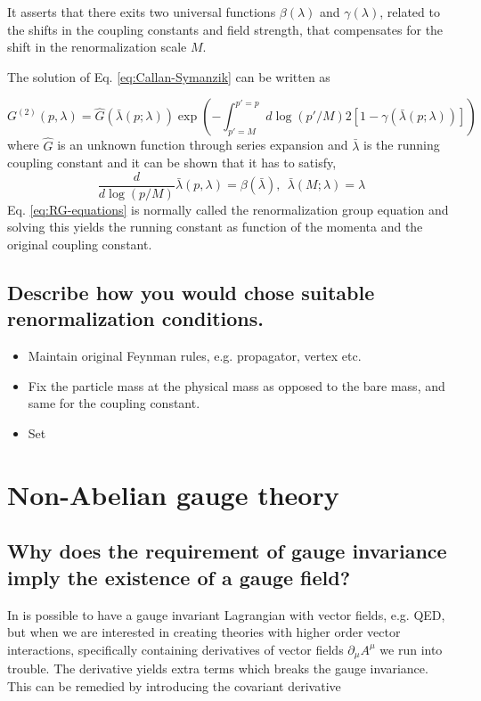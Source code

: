 \documentclass[paper=a4, fontsize=11pt]{scrartcl} %
\numberwithin{equation}{section} %
\numberwithin{figure}{section} %
\numberwithin{table}{section} %
\newcommand{\parentheses}[1]{\ensuremath{\left( #1 \right)}}
\newcommand{\commutator}[1]{\ensuremath{\left[ #1 \right]}}
\begin{document}
It asserts that there exits two universal functions $\beta(\lambda)$ and $\gamma(\lambda)$, related to the shifts in the coupling constants and field strength, that compensates for the shift in the renormalization scale $M$.

The solution of Eq. \eqref{eq:Callan-Symanzik} can be written as

\begin{equation}
G^{(2)}(p,\lambda)= \hat{G}\parentheses{\bar{\lambda}(p;\lambda)} \exp \parentheses{- \int _{p'=M}^{p'=p} d \log (p'/M) 2\commutator{1-\gamma \parentheses{\bar{\lambda}(p;\lambda)}}}
\end{equation}
where $\hat{G}$ is an unknown function through series expansion and $\bar{\lambda}$ is the running coupling constant and it can be shown that it has to satisfy,
\begin{equation}
\frac{d}{d\log(p/M)}\bar{\lambda} (p, \lambda) = \beta (\bar{\lambda}), ~~ \bar{\lambda}(M;\lambda) = \lambda
\label{eq:RG-equations}
\end{equation}
Eq. \eqref{eq:RG-equations} is normally called the renormalization group equation and solving this yields the running constant as function of the momenta and the original coupling constant.

\subsection{Describe how you would chose suitable renormalization conditions.}
\begin{itemize}
 \item Maintain original Feynman rules, e.g. propagator, vertex etc.
 \item Fix the particle mass at the physical mass as opposed to the bare mass, and same for the coupling constant.
 \item Set
\end{itemize}



\section{Non-Abelian gauge theory}

\subsection{Why does the requirement of gauge invariance imply the existence of a gauge field?}
In is possible to have a gauge invariant Lagrangian with vector fields, e.g. QED, but when we are interested in creating theories with higher order vector interactions, specifically containing derivatives of vector fields $\partial_{\mu}A^{\mu}$ we run into trouble. The derivative yields extra terms which breaks the gauge invariance. This can be remedied by introducing the covariant derivative
\end{document}
